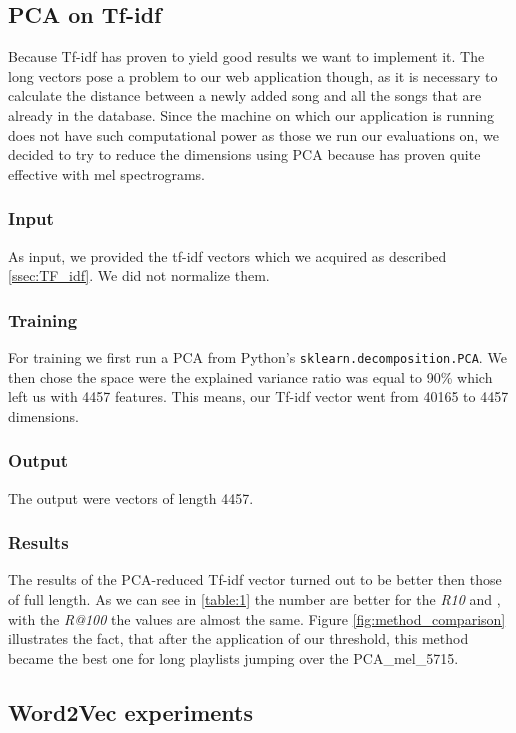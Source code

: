\subsection{PCA on Tf-idf}\label{ssec:PCA_on_tf_idf}

Because Tf-idf has proven to yield good results we want to implement it. The long vectors pose a problem to our web application though, as it is necessary to calculate the distance between a newly added song and all the songs that are already in the database. Since the machine on which our application is running does not have such computational power as those we run our evaluations on, we decided to try to reduce the dimensions using PCA because has proven quite effective with mel spectrograms.

\subsubsection{Input}
As input, we provided the tf-idf vectors which we acquired as described \ref{ssec:TF_idf}. We did not normalize them.

\subsubsection{Training}
For training we first run a PCA from Python's \texttt{sklearn.decomposition.PCA}. We then chose the space were the explained variance ratio was equal to 90\% which left us with 4457 features. This means, our Tf-idf vector went from 40165 to 4457 dimensions. 

\subsubsection{Output}
The output were vectors of length 4457.

\subsubsection{Results}
The results of the PCA-reduced Tf-idf vector turned out to be better then those of full length. As we can see in \ref{table:1} the number are better for the \textit{R10} and , with the \textit{R@100} the values are almost the same. Figure \ref{fig:method_comparison} illustrates the fact, that after the application of our threshold, this method became the best one for long playlists jumping over the PCA\_mel\_5715. 

\subsection{Word2Vec experiments}\label{ssec:w2v_experiments}


